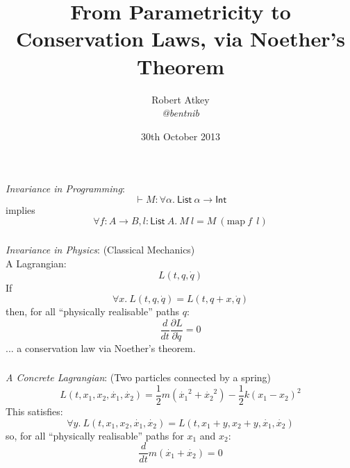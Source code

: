 \documentclass[xetex,serif,mathserif]{beamer}
\title{From Parametricity to Conservation Laws, via Noether's Theorem}
\author{Robert Atkey \\ {\small \textcolor{black!60}{\textit{@bentnib}}}}
\date{30th October 2013}
\newenvironment{slide}[1]{\begin{frame}\frametitle{#1}}{\end{frame}}
\begin{document}
\frame{\titlepage}

\begin{slide}{}
  \textcolor{titlered}{\emph{Invariance in Programming}}:
  \begin{displaymath}
    \vdash M : \forall \alpha.~\mathsf{List}~\alpha \to \mathsf{Int}
  \end{displaymath}
  \quad implies
  \begin{displaymath}
    \forall f : A \to B, l : \mathsf{List}~A.~M~l = M~(\mathrm{map}~f~~l)
  \end{displaymath}
\end{slide}

\begin{slide}{}
  \textcolor{titlered}{\emph{Invariance in Physics}}: \hspace{3cm} \textcolor{black!60}{(Classical Mechanics)} \\
  \quad A Lagrangian:
  \begin{displaymath}
    L(t, q, \dot{q})
  \end{displaymath}
  \quad If
  \begin{displaymath}
    \forall x.~L(t, q, \dot{q}) = L(t, q + x, \dot{q})
  \end{displaymath}
  \quad then, for all “physically realisable” paths $q$:
  \begin{displaymath}
    \frac{d}{dt}\frac{\partial L}{\partial \dot{q}} = 0
  \end{displaymath}
  \quad\quad ... a conservation law via Noether's theorem.
\end{slide}

\begin{slide}{}
  \textcolor{titlered}{\emph{A Concrete Lagrangian}}: \hspace{1cm} \textcolor{black!60}{(Two particles connected by a spring)}
  \begin{displaymath}
    L(t, x_1, x_2, \dot{x_1}, \dot{x_2}) = \frac{1}{2}m(\dot{x_1}^2 + \dot{x_2}^2) - \frac{1}{2}k(x_1 - x_2)^2
  \end{displaymath}
  \quad This satisfies:
  \begin{displaymath}
    \forall y.~L(t, x_1, x_2, \dot{x_1}, \dot{x_2}) = L(t, x_1 + y, x_2 + y, \dot{x_1}, \dot{x_2})
  \end{displaymath}
  \quad so, for all “physically realisable” paths for $x_1$ and $x_2$:
  \begin{displaymath}
    \frac{d}{dt}m(\dot{x_1} + \dot{x_2}) = 0
  \end{displaymath}
\end{slide}
\end{document}
